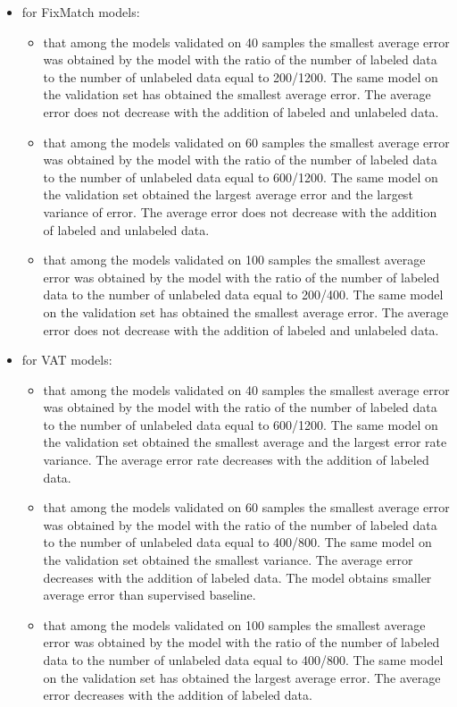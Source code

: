 \documentclass[12pt]{article}
\theoremstyle{definition}
\DeclareRobustCommand{\[}{\begin{equation}}
\DeclareRobustCommand{\]}{\end{equation}}
\begin{document}
\begin{itemize}
    \item for FixMatch models:
    \begin{itemize}
        \item that among the models validated on 40 samples the smallest average error was obtained by the model with the ratio of the number of labeled data to the number of unlabeled data equal to 200/1200. The same model on the validation set has obtained the smallest average error. The average error does not decrease with the addition of labeled and unlabeled data.
         \item that among the models validated on 60 samples the smallest average error was obtained by the model with the ratio of the number of labeled data to the number of unlabeled data equal to 600/1200. The same model on the validation set obtained the largest average error and the largest variance of error.  The average error does not decrease with the addition of labeled and unlabeled data. 
        \item that among the models validated on 100 samples the smallest average error was obtained by the model with the ratio of the number of labeled data to the number of unlabeled data equal to 200/400. The same model on the validation set has obtained the smallest average error. The average error does not decrease with the addition of labeled and unlabeled data.
    \end{itemize}
    \item for VAT models:
    \begin{itemize}
        \item that among the models validated on 40 samples the smallest average error was obtained by the model with the ratio of the number of labeled data to the number of unlabeled data equal to 600/1200. The same model on the validation set obtained the smallest average and the largest error rate variance. The average error rate decreases with the addition of labeled data.
        \item that among the models validated on 60 samples the smallest average error was obtained by the model with the ratio of the number of labeled data to the number of unlabeled data equal to 400/800. The same model on the validation set obtained the smallest variance. The average error decreases with the addition of labeled data. The model obtains smaller average error than supervised baseline.
        \item that among the models validated on 100 samples the smallest average error was obtained by the model with the ratio of the number of labeled data to the number of unlabeled data equal to 400/800. The same model on the validation set has obtained the largest average error. The average error decreases with the addition of labeled data. 
    \end{itemize}
\end{itemize}
\end{document}
